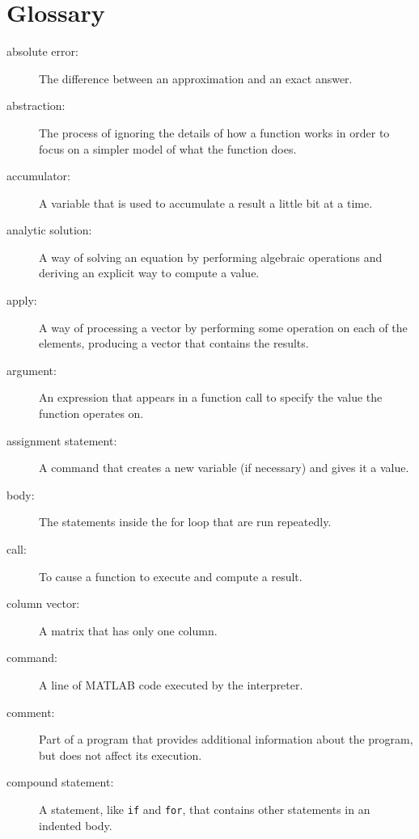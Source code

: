

\chapter*{Glossary}

\begin{description}


\item[absolute error:] The difference between an approximation and
an exact answer.

\item[abstraction:] The process of ignoring the details of how
a function works in order to focus on a simpler model of what the
function does.

\item[accumulator:] A variable that is used to accumulate a result
a little bit at a time.

\item[analytic solution:] A way of solving an equation by performing
algebraic operations and deriving an explicit way to
compute a value.

\item[apply:] A way of processing a vector by performing some operation
on each of the elements, producing a vector that contains the
results.

\item[argument:] An expression that appears in a function call to
specify the value the function operates on.

\item[assignment statement:] A command that creates a new variable
(if necessary) and gives it a value.

\item[body:] The statements inside the for loop that are run
repeatedly.

\item[call:] To cause a function to execute and compute a result.

\item[column vector:] A matrix that has only one column.

\item[command:] A line of MATLAB code executed by the interpreter.

\item[comment:] Part of a program that provides additional information
about the program, but does not affect its execution.

\item[compound statement:] A statement, like {\tt if} and {\tt for}, that
contains other statements in an indented body.


\end{description}
